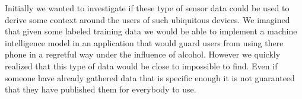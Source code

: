 Initially we wanted to investigate if these type of sensor data could be used to derive some context around the users of such ubiquitous devices. We imagined that given some labeled training data we would be able to implement a machine intelligence model in an application that would guard users from using there phone in a regretful way under the influence of alcohol. However we quickly realized that this type of data would be close to impossible to find. Even if someone have already gathered data that is specific enough it is not guaranteed that they have published them for everybody to use.

